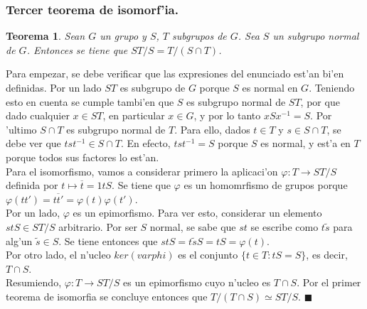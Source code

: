 \documentclass[a4paper,openright,12pt]{report}
\numberwithin{equation}{section} %
\newtheorem{teorema}{Teorema}[section] %
\newenvironment{proof}{\noindent{\it Demostracion:}}{\hfill$\blacksquare$} %
\begin{document}
\subsubsection{Tercer teorema de isomorf'ia.}
\begin{teorema}
Sean $G$ un grupo y $S$, $T$ subgrupos de $G$. Sea $S$ un subgrupo normal de $G$. Entonces se tiene que $ST/S=T/ (S \cap T)$.
\end{teorema}
\begin{proof}
Para empezar, se debe verificar que las expresiones del enunciado est'an bi'en definidas. Por un lado $ST$ es subgrupo de $G$ porque $S$ es normal en $G$. Teniendo esto en cuenta se cumple tambi'en que $S$ es subgrupo normal de $ST$, por que dado cualquier $x \in ST$, en particular $x \in G$, y por lo tanto $xSx^{-1}=S$. Por 'ultimo $S \cap T$ es subgrupo normal de $T$. Para ello, dados $t \in T$ y $s \in S \cap T$, se debe ver que $tst^{-1} \in S \cap T$. En efecto, $tst^{-1}=S$ porque $S$ es normal, y est'a en $T$ porque todos sus factores lo est'an.\\
Para el isomorfismo, vamos a considerar primero la aplicaci'on $\varphi:T \rightarrow ST/S$ definida por $t \mapsto \overline{t}=1tS$. Se tiene que $\varphi$ es un homomrfismo de grupos porque $\varphi(tt')=\overline{tt'}=\varphi(t)\varphi(t')$.\\
Por un lado, $\varphi$ es un epimorfismo. Para ver esto, considerar un elemento $stS \in ST/S$ arbitrario. Por ser $S$ normal, se sabe que $st$ se escribe como $t \widetilde s$ para alg'un $\widetilde s \in S$. Se tiene entonces que $stS=t \widetilde s S=tS=\varphi(t)$.\\
Por otro lado, el n'ucleo $ker (varphi)$ es el conjunto $\{ t \in T:tS=S \}$, es decir, $T \cap S$.\\
Resumiendo, $\varphi:T \rightarrow ST/S$ es un epimorfismo cuyo n'ucleo es $T \cap S$. Por el primer teorema de isomorfia se concluye entonces que $T/(T \cap S) \simeq ST/S$.
\end{proof}
\end{document}
